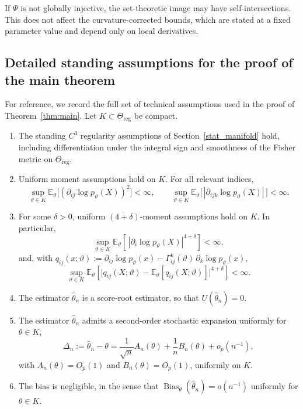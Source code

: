 \documentclass[11pt,letterpaper]{amsart}
\newcommand{\E}{\mathbb{E}}
\numberwithin{equation}{section}
\theoremstyle{plain}
\theoremstyle{definition}
\theoremstyle{remark}
\begin{document}
If $\Psi$ is not globally injective, the set-theoretic image may have self-intersections. This does not affect the curvature-corrected bounds, which are stated at a fixed parameter value and depend only on local derivatives.

\subsection{Detailed standing assumptions for the proof of the main theorem}
\label{app:standing_assumptions}

For reference, we record the full set of technical assumptions used in the proof of Theorem~\ref{thm:main}. Let \(K \subset \Theta_{\mathrm{reg}}\) be compact.

\begin{enumerate}
\item The standing \(C^3\) regularity assumptions of Section~\ref{stat_manifold} hold, including differentiation under the integral sign and smoothness of the Fisher metric on \(\Theta_{\mathrm{reg}}\).

\item Uniform moment assumptions hold on \(K\). For all relevant indices,
\[
\sup_{\vartheta\in K}\E_\vartheta\!\big[(\partial_{ij}\log p_\vartheta(X))^2\big]<\infty,
\qquad
\sup_{\vartheta\in K}\E_\vartheta\!\big[\,|\partial_{ijk}\log p_\vartheta(X)|\,\big]<\infty.
\]

\item For some \(\delta>0\), uniform \((4+\delta)\)-moment assumptions hold on \(K\). In particular,
\[
\sup_{\vartheta\in K}\E_\vartheta\!\left[\,|\partial_i\log p_\vartheta(X)|^{4+\delta}\right]<\infty,
\]
and, with \(q_{ij}(x;\vartheta):=\partial_{ij}\log p_\vartheta(x)-\Gamma_{ij}^k(\vartheta)\,\partial_k\log p_\vartheta(x)\),
\[
\sup_{\vartheta\in K}\E_\vartheta\!\left[
\bigl|q_{ij}(X;\vartheta)-\E_\vartheta[q_{ij}(X;\vartheta)]\bigr|^{4+\delta}
\right]<\infty.
\]

\item The estimator \(\hat\theta_n\) is a score-root estimator, so that \(U(\hat\theta_n)=0\).

\item The estimator \(\hat\theta_n\) admits a second-order stochastic expansion uniformly for \(\theta\in K\),
\[
\Delta_n:=\hat\theta_n-\theta=\frac1{\sqrt n}A_n(\theta)+\frac1n B_n(\theta)+o_p(n^{-1}),
\]
with \(A_n(\theta)=O_p(1)\) and \(B_n(\theta)=O_p(1)\), uniformly on \(K\).

\item The bias is negligible, in the sense that \(\operatorname{Bias}_\theta(\hat\theta_n)=o(n^{-1})\) uniformly for \(\theta\in K\).


\end{enumerate}
\end{document}

